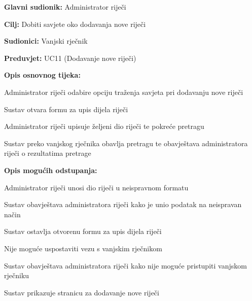 				\noindent {}
				\begin{packed_item}
					
					\item \textbf{Glavni sudionik: }Administrator riječi
					\item  \textbf{Cilj:} Dobiti savjete oko dodavanja nove riječi
					\item  \textbf{Sudionici:} Vanjski rječnik
					\item  \textbf{Preduvjet:} UC11 (Dodavanje nove riječi)
					\item  \textbf{Opis osnovnog tijeka:}
					
					\item[] \begin{packed_enum}
						
						\item Administrator riječi odabire opciju traženja savjeta pri dodavanju nove riječi
						\item Sustav otvara formu za upis dijela riječi
						\item Administrator riječi upisuje željeni dio riječi te pokreće pretragu
						\item Sustav preko vanjskog rječnika obavlja pretragu te obavještava administratora riječi o rezultatima pretrage
						
					\end{packed_enum}
					
					\item  \textbf{Opis mogućih odstupanja:}
					
					\item[] \begin{packed_item}
						
						\item[3.a] Administrator riječi unosi dio riječi u neispravnom formatu 
						\item[] \begin{packed_enum}
							
							\item Sustav obavještava administratora riječi kako je unio podatak na neispravan način
							\item Sustav ostavlja otvorenu formu za upis dijela riječi
							
						\end{packed_enum}
						
						\item[3.b] Nije moguće uspostaviti vezu s vanjskim rječnikom 
						\item[] \begin{packed_enum}
							
							\item Sustav obavještava administratora riječi kako nije moguće pristupiti vanjskom rječniku
							\item Sustav prikazuje stranicu za dodavanje nove riječi
							
						\end{packed_enum}
						
						
					\end{packed_item}
				\end{packed_item}
				

